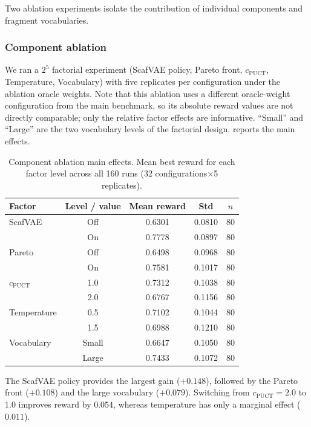 \documentclass[jcim,article,layout=manuscript]{achemso}
\begin{document}
Two ablation experiments isolate the contribution of individual
components and fragment vocabularies.

\subsubsection{Component ablation}

We ran a $2^5$ factorial experiment (ScafVAE policy, Pareto front,
$c_{\text{PUCT}}$, Temperature, Vocabulary) with five replicates per
configuration under the ablation oracle weights. Note that this ablation
uses a different oracle-weight configuration from the main benchmark,
so its absolute reward values are not directly comparable; only the
relative factor effects are informative. ``Small'' and ``Large'' are
the two vocabulary levels of the factorial design. 
reports the main effects.

\begin{table}[htbp]
  \centering
  \caption{Component ablation main effects. Mean best reward for each
    factor level across all 160 runs (32 configurations$\times$5 replicates).}
  \label{tab:ablation}
  \begin{tabular}{lcccc}
    \toprule
    Factor & Level / value & Mean reward & Std & $n$ \\
    \midrule
    ScafVAE & Off & 0.6301 & 0.0810 & 80 \\
            & On  & 0.7778 & 0.0897 & 80 \\
    Pareto  & Off & 0.6498 & 0.0968 & 80 \\
            & On  & 0.7581 & 0.1017 & 80 \\
    $c_{\text{PUCT}}$ & 1.0 & 0.7312 & 0.1038 & 80 \\
                      & 2.0 & 0.6767 & 0.1156 & 80 \\
    Temperature       & 0.5 & 0.7102 & 0.1044 & 80 \\
                      & 1.5 & 0.6988 & 0.1210 & 80 \\
    Vocabulary          & Small & 0.6647 & 0.1050 & 80 \\
                      & Large & 0.7433 & 0.1072 & 80 \\
    \bottomrule
  \end{tabular}
\end{table}

The ScafVAE policy provides the largest gain ($+0.148$), followed by the
Pareto front ($+0.108$) and the large vocabulary ($+0.079$). Switching
from $c_{\text{PUCT}} = 2.0$ to $1.0$ improves reward by $0.054$,
whereas temperature has only a marginal effect ($0.011$).
\end{document}
